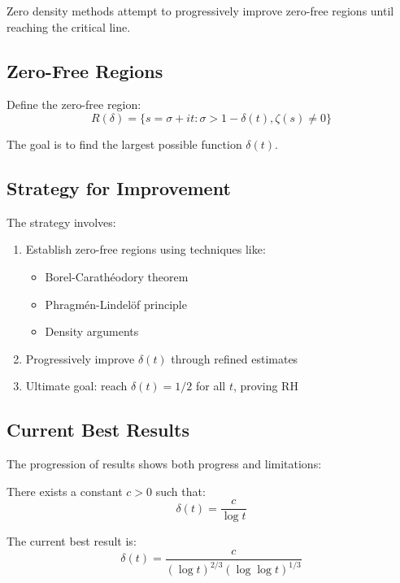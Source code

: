 Zero density methods attempt to progressively improve zero-free regions until reaching the critical line.

\subsection{Zero-Free Regions}

Define the zero-free region:
\begin{equation}
R(\delta) = \{s = \sigma + it : \sigma > 1 - \delta(t), \zeta(s) \neq 0\}
\end{equation}

The goal is to find the largest possible function $\delta(t)$.

\subsection{Strategy for Improvement}

The strategy involves:
\begin{enumerate}
\item Establish zero-free regions using techniques like:
   \begin{itemize}
   \item Borel-Carathéodory theorem
   \item Phragmén-Lindelöf principle  
   \item Density arguments
   \end{itemize}
\item Progressively improve $\delta(t)$ through refined estimates
\item Ultimate goal: reach $\delta(t) = 1/2$ for all $t$, proving RH
\end{enumerate}

\subsection{Current Best Results}

The progression of results shows both progress and limitations:

\begin{theorem}
There exists a constant $c > 0$ such that:
\begin{equation}
\delta(t) = \frac{c}{\log t}
\end{equation}
\end{theorem}

\begin{theorem}
The current best result is:
\begin{equation}
\delta(t) = \frac{c}{(\log t)^{2/3}(\log \log t)^{1/3}}
\end{equation}
\end{theorem}

